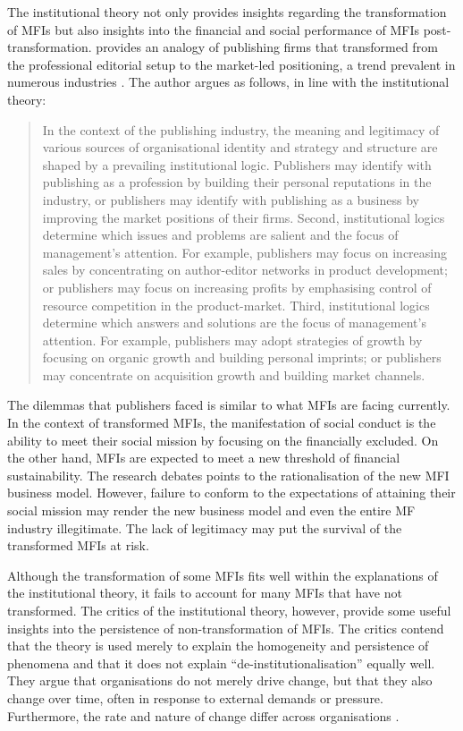 \documentclass[a4paper, nobind]{templates/ociamthesis}
\begin{document}
The institutional theory not only provides insights regarding the transformation of MFIs but also insights into the financial and social performance of MFIs post-transformation. \textcite{thornton2002rise} provides an analogy of publishing firms that transformed from the professional editorial setup to the market-led positioning, a trend prevalent in numerous industries \autocite{thornton2015institutional}. The author argues as follows, in line with the institutional theory:

\begin{quote}
In the context of the publishing industry, the meaning and legitimacy of various sources of organisational identity and strategy and structure are shaped by a prevailing institutional logic. Publishers may identify with publishing as a profession by building their personal reputations in the industry, or publishers may identify with publishing as a business by improving the market positions of their firms. Second, institutional logics determine which issues and problems are salient and the focus of management's attention. For example, publishers may focus on increasing sales by concentrating on author-editor networks in product development; or publishers may focus on increasing profits by emphasising control of resource competition in the product-market. Third, institutional logics determine which answers and solutions are the focus of management's attention. For example, publishers may adopt strategies of growth by focusing on organic growth and building personal imprints; or publishers may concentrate on acquisition growth and building market channels\autocite{thornton2002rise}.
\end{quote}

The dilemmas that publishers faced is similar to what MFIs are facing currently. In the context of transformed MFIs, the manifestation of social conduct is the ability to meet their social mission by focusing on the financially excluded. On the other hand, MFIs are expected to meet a new threshold of financial sustainability. The research debates points to the rationalisation of the new MFI business model. However, failure to conform to the expectations of attaining their social mission may render the new business model and even the entire MF industry illegitimate. The lack of legitimacy may put the survival of the transformed MFIs at risk.

Although the transformation of some MFIs fits well within the explanations of the institutional theory, it fails to account for many MFIs that have not transformed. The critics of the institutional theory, however, provide some useful insights into the persistence of non-transformation of MFIs. The critics contend that the theory is used merely to explain the homogeneity and persistence of phenomena and that it does not explain ``de-institutionalisation'' equally well. They argue that organisations do not merely drive change, but that they also change over time, often in response to external demands or pressure. Furthermore, the rate and nature of change differ across organisations \autocite{tina2002institutional}.
\end{document}
